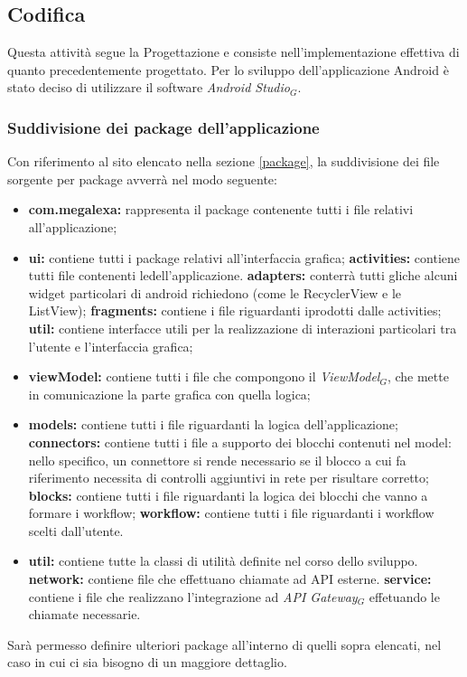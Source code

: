 \subsection{Codifica}
Questa attività segue la Progettazione e consiste nell'implementazione effettiva di quanto precedentemente progettato. Per lo sviluppo dell'applicazione Android è stato deciso di utilizzare il software \textit{Android Studio$_{G}$}.
\subsubsection{Suddivisione dei package dell'applicazione}
Con riferimento al sito elencato nella sezione \ref{package}, la suddivisione dei file sorgente per package avverrà nel modo seguente:

\begin{itemize}
	\item	\textbf{com.megalexa:} rappresenta il package contenente tutti i file relativi all'applicazione;
	\item	\textbf{ui:} contiene tutti i package relativi all'interfaccia grafica;
		\subitem  \textbf{activities:} contiene tutti file contenenti ledell'applicazione.
		\subitem  \textbf{adapters:} conterrà tutti gliche alcuni widget particolari di android richiedono (come le RecyclerView e le ListView);
		\subitem  \textbf{fragments:} contiene i file riguardanti iprodotti dalle activities;
		\subitem	\textbf{util:} contiene interfacce utili per la realizzazione di interazioni particolari tra l'utente e l'interfaccia grafica;
	\item  \textbf{viewModel:}	contiene tutti i file che compongono il \textit{ViewModel$_{G}$}, che mette in comunicazione la parte grafica con quella logica;	
	\item  \textbf{models:} contiene tutti i file riguardanti la logica dell'applicazione;
		\subitem \textbf{connectors:} contiene tutti i file a supporto dei blocchi contenuti nel model: nello specifico, un connettore si rende necessario se il blocco a cui fa riferimento necessita di controlli aggiuntivi in rete per risultare corretto;
		\subitem \textbf{blocks:} contiene tutti i file riguardanti la logica dei blocchi che vanno a formare i workflow;
		\subitem \textbf{workflow:} contiene tutti i file riguardanti i workflow scelti dall'utente.
	
	\item  \textbf{util:} contiene tutte la classi di utilità definite nel corso dello sviluppo.
		\subitem\textbf{network:} contiene file che effettuano chiamate ad API esterne.
		\subsubitem\textbf{service:} contiene i file che realizzano l'integrazione ad \textit{API Gateway$_{G}$} effetuando le chiamate necessarie.
	

\end{itemize}
Sarà permesso definire ulteriori package all'interno di quelli sopra elencati, nel caso in cui ci sia bisogno di un maggiore dettaglio.
